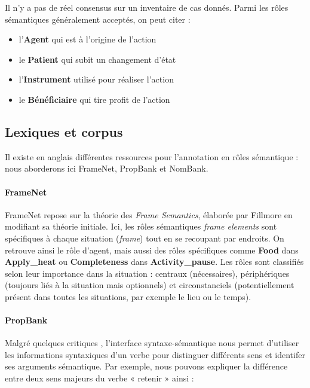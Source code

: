 Il n'y a pas de réel consensus sur un inventaire de cas donnés. Parmi les rôles
sémantiques généralement acceptés, on peut citer :

\begin{itemize}
    \item l'\textbf{Agent} qui est à l'origine de l'action
    \item le \textbf{Patient} qui subit un changement d'état
    \item l'\textbf{Instrument} utilisé pour réaliser l'action
    \item le \textbf{Bénéficiaire} qui tire profit de l'action
\end{itemize}

\subsection{Lexiques et corpus}

Il existe en anglais différentes ressources pour l'annotation en rôles
sémantique : nous aborderons ici FrameNet, PropBank et NomBank.

\paragraph{FrameNet}

FrameNet repose sur la théorie des \textit{Frame Semantics}, élaborée par
Fillmore en modifiant sa théorie initiale. Ici, les rôles sémantiques
\textit{frame elements} sont spécifiques à chaque situation (\textit{frame})
tout en se recoupant par endroits. On retrouve ainsi le rôle d'agent, mais
aussi des rôles spécifiques comme \textbf{Food} dans \textbf{Apply\_heat} ou
\textbf{Completeness} dans \textbf{Activity\_pause}. Les rôles sont classifiés
selon leur importance dans la situation : centraux (nécessaires), périphériques
(toujours liés à la situation mais optionnels) et circonstanciels
(potentiellement présent dans toutes les situations, par exemple le lieu ou le
temps).

\paragraph{PropBank}

Malgré quelques critiques \citep{riemer2011conception}, l'interface
syntaxe-sémantique nous permet d'utiliser les informations syntaxiques d'un
verbe pour distinguer différents sens et identifer ses arguments sémantique.
Par exemple, nous pouvons expliquer la différence entre deux sens majeurs du
verbe « retenir » ainsi :

